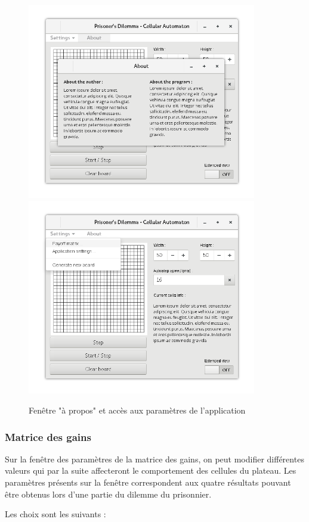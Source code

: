 \documentclass[a4paper, french]{article}
\begin{document}
\vfill
\begin{figure}[htp]
    \centering
    \includegraphics[width=10cm]{interface/mainviewabout.png}
    \includegraphics[width=10cm]{interface/mainviewsettings.png}
    \caption{Fenêtre "à propos" et accès aux paramètres de l'application}
\end{figure}
\vfill

\pagebreak
\subsubsection{Matrice des gains}
Sur la fenêtre des paramètres de la matrice des gains, on peut modifier différentes valeurs qui par la suite affecteront le comportement des cellules du plateau. Les paramètres présents sur la fenêtre correspondent aux quatre résultats pouvant être obtenus lors d'une partie du dilemme du prisonnier.

Les choix sont les suivants : 
\end{document}
